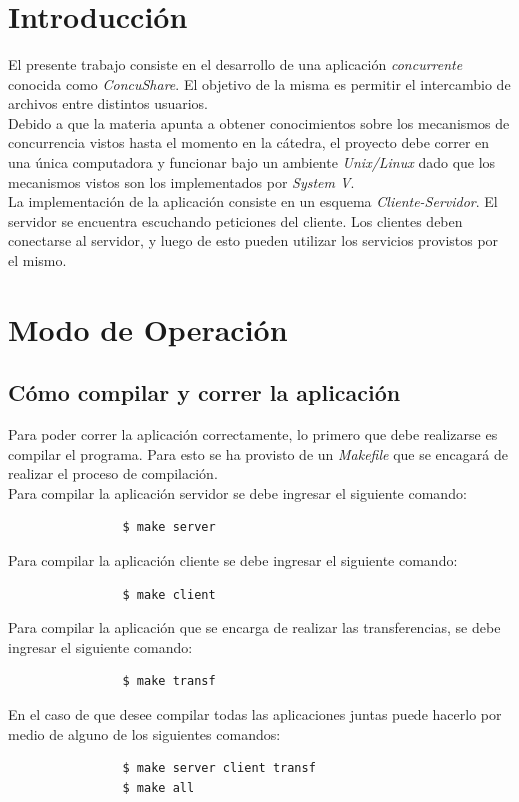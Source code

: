 \documentclass[a4paper,10pt]{article}
\title{  }
\begin{document}
	\maketitle %
	\newpage

	\tableofcontents %
	\newpage

	\section{Introducci\'on}
		El presente trabajo consiste en el desarrollo de una aplicaci\'on {\it concurrente} conocida como \emph{ConcuShare}. El objetivo de la misma
		es permitir el intercambio de archivos entre distintos usuarios. \\
		\indent Debido a que la materia apunta a obtener conocimientos sobre los mecanismos de concurrencia vistos hasta el momento en la c\'atedra, 
    el proyecto debe correr en una \'unica computadora y funcionar bajo un ambiente \emph{Unix/Linux} dado que los mecanismos vistos son los 
    implementados por \emph{System V}. \\
		\indent La implementaci\'on de la aplicaci\'on consiste en un esquema \emph{Cliente-Servidor}. El servidor se encuentra escuchando peticiones
		del cliente. Los clientes deben conectarse al servidor, y luego de esto pueden utilizar los servicios provistos por el mismo.
		\vspace{0.5cm}

	\section{Modo de Operaci\'on}

		\subsection {C\'omo compilar y correr la aplicaci\'on}
			Para poder correr la aplicaci\'on correctamente, lo primero que debe realizarse es compilar el programa. Para esto se ha provisto de un
			\emph{Makefile} que se encagar\'a de realizar el proceso de compilaci\'on. \\
			\indent Para compilar la aplicaci\'on servidor se debe ingresar el siguiente comando:
			\begin{verbatim}
				$ make server
			\end{verbatim}
			\indent Para compilar la aplicaci\'on cliente se debe ingresar el siguiente comando:
			\begin{verbatim}
				$ make client
			\end{verbatim}
			\indent Para compilar la aplicaci\'on que se encarga de realizar las transferencias, se debe ingresar el siguiente comando:
			\begin{verbatim}
				$ make transf
			\end{verbatim}
			\indent En el caso de que desee compilar todas las aplicaciones juntas puede hacerlo por medio de alguno de los siguientes comandos:
			\begin{verbatim}
				$ make server client transf
				$ make all
			\end{verbatim}
\end{document}
